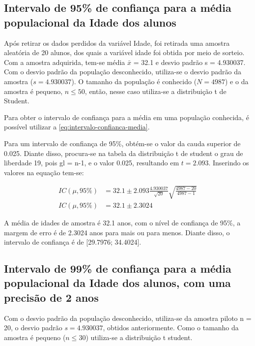 \subsection{Intervalo de 95\% de confiança para a média populacional da Idade dos alunos}
\label{sub:1a}
	
	Após retirar os dados perdidos da variável Idade, foi retirada uma
	amostra aleatória de 20 alunos, dos quais a variável idade foi obtida por meio de sorteio. Com a amostra
	adquirida, tem-se média $\bar{x}$ = \num{32,1} e desvio padrão s = \num{4,930037}.
	Com o desvio padrão da população desconhecido, utiliza-se o desvio
	padrão da amostra ($s = \num{4,930037}$).  O tamanho da população é conhecido ($N
	= 4987$) e o da amostra é pequeno, $n \leq 50$, então, nesse caso utiliza-se
	a distribuição t de Student.

	Para obter o intervalo de confiança para a média em uma população
	conhecida, é possível utilizar a \autoref{eq:intervalo-confianca-media}.

	Para um intervalo de confiança de 95\%, obtém-se o valor da cauda
	superior de \num{0,025}. Diante disso, procura-se na tabela da distribuição
	t de student o grau de liberdade 19, pois gl = n-1, e o valor \num{0,025},
	resultando em $t = \num{2,093}$. Inserindo os valores na equação
	tem-se:

	\begin{align*}
		IC (\mu, 95\%) &= \num{32,1} \pm \num{2,093} \frac{\num{4,930037}}{\sqrt{20}} \sqrt{\frac{4987 - 20}{4987 - 1}} \\
		IC (\mu, 95\%) &= \num{32,1} \pm \num{2,3024}
	\end{align*}

	A média de idades de amostra é \num{32,1} anos, com o nível de confiança de
	95\%, a margem de erro é de \num{2,3024} anos para mais ou para menos. Diante
	disso, o intervalo de confiança é de [\num{29,7976}; \num{34,4024}].

\subsection{Intervalo de 99\% de confiança para a média populacional da Idade dos alunos, com uma precisão de 2 anos}

	Com o desvio padrão da população desconhecido, utiliza-se da amostra
	piloto n = 20, o desvio padrão $s = \num{4,930037}$, obtidos anteriormente. Como o
	tamanho da amostra é pequeno ($n \leq 30$) utiliza-se a distribuição t student.

